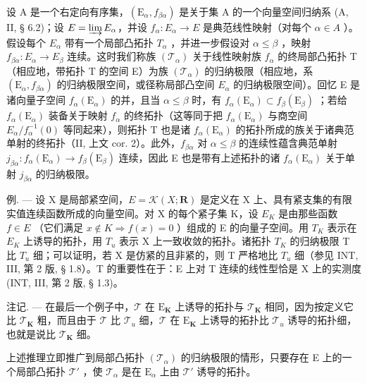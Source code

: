 设 A 是一个右定向有序集，\((\mathrm{E}_{\alpha}, f_{\beta\alpha})\) 是关于集 A 的一个向量空间归纳系 (A, II, § 6.2)；设 \(E = \varinjlim E_{\alpha}\)，并设 \(f_{\alpha}: E_{\alpha} \to E\) 是典范线性映射（对每个 \(\alpha \in A\) ）。假设每个 \(E_{\alpha}\) 带有一个局部凸拓扑 \(T_{\alpha}\) ，并进一步假设对 \(\alpha \leqslant \beta\) ，映射 \(f_{\beta\alpha}: E_{\alpha} \to E_{\beta}\) 连续。这时我们称族 \((\mathcal{T}_{\alpha})\) 关于线性映射族 \(f_{\alpha}\) 的终局部凸拓扑 T（相应地，带拓扑 T 的空间 E）为族 \((\mathcal{T}_{\alpha})\) 的归纳极限（相应地，系 \((\mathrm{E}_{\alpha}, f_{\beta\alpha})\) 的归纳极限空间，或径称局部凸空间 \(E_{\alpha}\) 的归纳极限空间）。回忆 E 是诸向量子空间 \(f_{\alpha}(\mathrm{E}_{\alpha})\) 的并，且当 \(\alpha \leqslant \beta\) 时，有 \(f_{\alpha}(\mathrm{E}_{\alpha}) \subset f_{\beta}(\mathrm{E}_{\beta})\) ；若给 \(f_{\alpha}(\mathrm{E}_{\alpha})\) 装备关于映射 \(f_{\alpha}\) 的终拓扑（这等同于把 \(f_{\alpha}(\mathrm{E}_{\alpha})\) 与商空间 \(E_{\alpha}/f_{\alpha}^{-1}(0)\) 等同起来），则拓扑 T 也是诸 \(f_{\alpha}(\mathrm{E}_{\alpha})\) 的拓扑所成的族关于诸典范单射的终拓扑（II, 上文 cor. 2）。此外，\(f_{\beta\alpha}\) 对 \(\alpha \leqslant \beta\) 的连续性蕴含典范单射 \(j_{\beta\alpha}: f_{\alpha}(\mathrm{E}_{\alpha}) \to f_{\beta}(\mathrm{E}_{\beta})\) 连续，因此 E 也是带有上述拓扑的诸 \(f_{\alpha}(\mathrm{E}_{\alpha})\) 关于单射 \(j_{\beta\alpha}\) 的归纳极限。

例. --- 设 X 是局部紧空间，\(E = \mathcal{K}(X; \mathbf{R})\) 是定义在 X 上、具有紧支集的有限实值连续函数所成的向量空间。对 X 的每个紧子集 K，设 \(E_{K}\) 是由那些函数 \(f \in E\) （它们满足 \(x \notin K \Rightarrow f(x) = 0\) ）组成的 E 的向量子空间。用 \(T_{K}\) 表示在 \(E_{K}\) 上诱导的拓扑，用 \(T_{u}\) 表示 X 上一致收敛的拓扑。诸拓扑 \(T_{K}\) 的归纳极限 T 比 \(T_{u}\) 细；可以证明，若 X 是仿紧的且非紧的，则 T 严格地比 \(T_{u}\) 细（参见 INT, III, 第 2 版, § 1.8）。T 的重要性在于：E 上对 T 连续的线性型恰是 X 上的实测度 (INT, III, 第 2 版, § 1.3)。

注记. --- 在最后一个例子中，\(\mathcal{T}\) 在 \(\mathrm{E}_{\mathbf{K}}\) 上诱导的拓扑与 \(\mathcal{T}_{\mathbf{K}}\) 相同，因为按定义它比 \(\mathcal{T}_{\mathbf{K}}\) 粗，而且由于 \(\mathcal{T}\) 比 \(\mathcal{T}_{u}\) 细，\(\mathcal{T}\) 在 \(\mathrm{E}_{\mathbf{K}}\) 上诱导的拓扑比 \(\mathcal{T}_{u}\) 诱导的拓扑细，也就是说比 \(\mathcal{T}_{\mathbf{K}}\) 细。

上述推理立即推广到局部凸拓扑 \((\mathcal{T}_{\alpha})\) 的归纳极限的情形，只要存在 E 上的一个局部凸拓扑 \(\mathcal{T}'\) ，使 \(\mathcal{T}_{\alpha}\) 是在 \(\mathrm{E}_{\alpha}\) 上由 \(\mathcal{T}'\) 诱导的拓扑。

